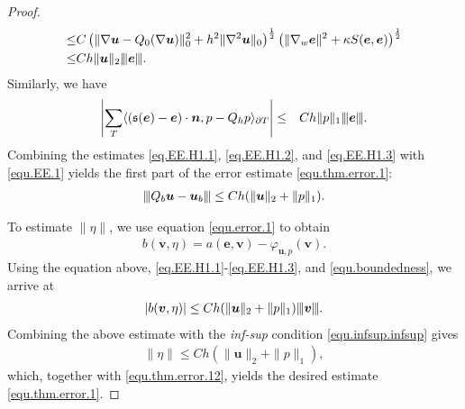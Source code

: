 \documentclass[final,leqno]{siamltex704}
\newcommand{\vertiii}[1]{{\left\vert\kern-0.25ex\left\vert\kern-0.25ex\left\vert #1
    \right\vert\kern-0.25ex\right\vert\kern-0.25ex\right\vert}}
\def\S{{\mathfrak s}}
\begin{document}
\begin{proof}
\begin{equation}
\begin{split}
\leq & C \left(\|\nabla \bm{u}-Q_0(\nabla \bm{u})\|^2_0 + h^2\|\nabla^2 \bm{u} \|_{0}\right)^{\frac{1}{2}}\left( \|\nabla_w \bm{e}\|^2+ \kappa S(\bm{e}, \bm{e})\right)^{\frac{1}{2}}\\
\leq & Ch\|\bm{u}\|_2\vertiii{\bm{e}}.
\end{split}
\end{equation}
Similarly, we have
\begin{eqnarray}\label{eq.EE.H1.3}
\left|\sum_{T} \langle (\S(\bm{e})-\bm{e})\cdot \bm{n},p - Q_h p\rangle_{\partial T}\right|&\leq & Ch\|p\|_1\vertiii{\bm{e}}.
\end{eqnarray}
Combining the estimates \eqref{eq.EE.H1.1}, \eqref{eq.EE.H1.2}, and \eqref{eq.EE.H1.3} with \eqref{equ.EE.1} yields the first part of the error estimate \eqref{equ.thm.error.1}:
\begin{eqnarray} \label{equ.thm.error.12}
\vertiii{Q_b\bm{u} -\bm{u}_b} \leq Ch(\|\bm{u}\|_2+\|p\|_1).
\end{eqnarray}

To estimate $\|\eta\|$, we use equation \eqref{equ.error.1} to obtain
\begin{eqnarray*}
b(\bm{v},\eta) =a(\bm{e},\bm{v})-\varphi_{\bm{u},p}(\bm{v}).
\end{eqnarray*}
Using the equation above, \eqref{eq.EE.H1.1}-\eqref{eq.EE.H1.3}, and \eqref{equ.boundedness}, we arrive at
\begin{eqnarray*}
|b(\bm{v},\eta)| \leq Ch(\|\bm{u}\|_2+\|p\|_1)\vertiii{\bm{v}}.
\end{eqnarray*}
Combining the above estimate with the {\em inf-sup} condition \eqref{equ.infsup.infsup} gives
\begin{eqnarray*}
\| \eta \| \leq Ch(\|\bm{u}\|_2+\|p\|_1),
\end{eqnarray*}
which, together with \eqref{equ.thm.error.12}, yields the desired estimate \eqref{equ.thm.error.1}.
\end{proof}
\end{document}
